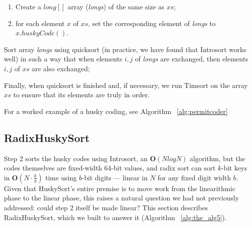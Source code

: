 \documentclass[twoside,leqno,twocolumn]{article}
\begin{document}
\begin{steps}
\item  
\renewcommand{\labelenumi}{\alph{enumi}}
    \begin{enumerate}
    \item Create a $long[]$ array (\emph{longs}) of the same size as $xs$;
    \item for each element $x$ of $xs$, set the corresponding element of \emph{longs} to $x.huskyCode()$.
    \end{enumerate}
\item {}Sort array \emph{longs} using quicksort (in practice, we have found that Introsort\cite{doi:10.1002} works well)
in such a way that when elements $i, j$ of \emph{longs} are exchanged, then elements $i, j$ of $xs$ are also exchanged;
\item {}Finally, when quicksort is finished and, if necessary,
we run Timsort on the array $xs$ to ensure that its elements are truly in order.
\end{steps}

For a worked example of a husky coding, see Algorithm ~\ref{alg:permitcoder}

\subsection{RadixHuskySort}
\label{sec:radix}

Step 2 sorts the husky codes using Introsort, an $\textbf{O}(N log N)$ algorithm,
but the codes themselves are fixed-width 64-bit values,
and radix sort can sort $k$-bit keys in $\textbf{O}(N \cdot \frac{k}{b})$ time using $b$-bit digits —
linear in $N$ for any fixed digit width $b$.
Given that HuskySort's entire premise is to move work from the linearithmic phase to the linear phase,
this raises a natural question we had not previously addressed:
could step 2 itself be made linear? This section describes RadixHuskySort, which we built to answer it (Algorithm ~\ref{alg:the_alg5}).
\end{document}
